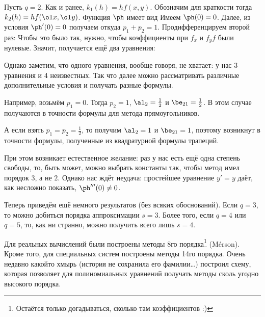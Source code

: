 \documentclass[a4paper]{article}
\begin{document}
\begin{ex}
Пусть $q = 2$. Как и ранее, $k_1(h) = hf(x,y)$.
Обозначим для краткости
тогда $k_2(h) =h f(\ol x, \ol y)$. Функция $\ph$ имеет вид
Имеем $\ph(0) = 0$. Далее, из условия $\ph'(0) = 0$ получаем
откуда $p_1 + p_2 = 1$.
Продифференцируем второй раз:
Чтобы это было так, нужно, чтобы коэффициенты при $f_x$ и $f_yf$ были нулевые.
Значит, получается ещё два уравнения:

Однако заметим, что одного уравнения, вообще говоря, не хватает: у нас 3 уравнения и 4 неизвестных.
Так что далее можно рассматривать различные дополнительные условия и получать разные формулы.

Например, возьмём $p_1 = 0$. Тогда $p_2 = 1$,  $\al_2 = \frac12$ и $\be_{21} = \frac12$.
В этом случае получаются в точности формулы для метода прямоугольников.

А если взять $p_1 = p_2 = \frac12$, то получим $\al_2 = 1$ и $\be_{21} = 1$, поэтому возникнут
в точности формулы, полученные из квадратурной формулы трапеций.

При этом возникает естественное желание: раз у нас есть ещё одна степень свободы,
то, быть может, можно выбрать константы так, чтобы метод имел порядок $3$, а не $2$.
Однако нас ждёт неудача: простейшее уравнение $y' = y$ даёт, как несложно показать,
$\ph'''(0) \ne 0$.

Теперь приведём ещё немного результатов (без всяких обоснований).
Если $q = 3$, то можно добиться порядка аппроксимации $s = 3$.  Более того,
если $q = 4$ или $q = 5$, то, как ни странно, можно получить всего лишь $s = 4$.

Для реальных вычислений были построены методы 8\д го порядка\footnote{Остаётся
только догадываться, сколько там коэффициентов :)} (M\'erson).
Кроме того, для специальных систем построены методы 14\д го порядка. Очень недавно какой\д то
хмырь (история не сохранила его фамилии\ldots) построил схему, которая позволяет для полиномиальных уравнений получать методы
сколь угодно высокого порядка.
\end{ex}
\end{document}
